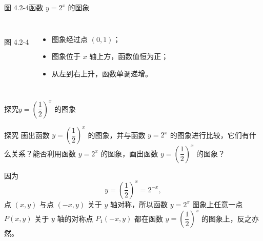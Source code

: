 \documentclass[aspectratio=169,11pt,t,fleqn]{ctexbeamer}
\begin{document}
\begin{frame}{图 4.2-4\quad 函数 $y=2^x$ 的图象}
  \begin{columns}
    \centering
    \\[2pt]
    图 4.2-4

    \begin{itemize}
      \item 图象经过点 $(0,1)$；
      \item 图象位于 $x$ 轴上方，函数值恒为正；
      \item 从左到右\alert{上升}，函数单调递增。
    \end{itemize}
  \end{columns}
\end{frame}

\begin{frame}{探究\quad $y=\left(\dfrac12\right)^x$ 的图象}
  \begin{block}{探究}
    画出函数 $y=\left(\dfrac12\right)^x$ 的图象，并与函数 $y=2^x$ 的图象进行比较，它们有什么关系？能否利用函数 $y=2^x$ 的图象，画出函数 $y=\left(\dfrac12\right)^x$ 的图象？
  \end{block}

  \vspace{0.6em}
  因为
  \[
    y=\left(\frac12\right)^x=2^{-x},
  \]
  点 $(x,y)$ 与点 $(-x,y)$ 关于 $y$ 轴对称，所以函数 $y=2^x$ 图象上任意一点 $P(x,y)$ 关于 $y$ 轴的对称点 $P_1(-x,y)$ 都在函数 $y=\left(\dfrac12\right)^x$ 的图象上，反之亦然。
\end{frame}
\end{document}
